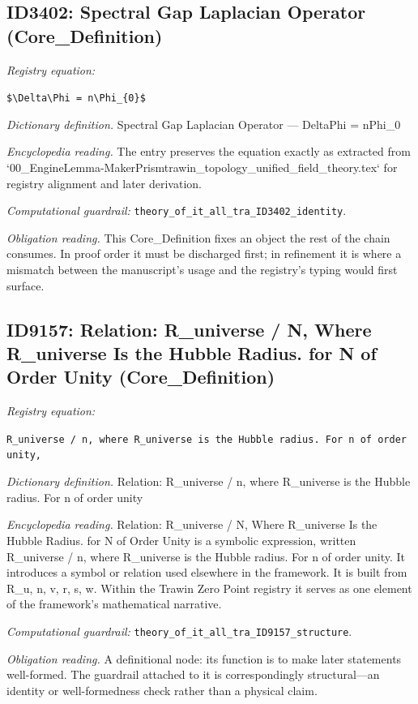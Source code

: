\documentclass[11pt]{article}
\theoremstyle{remark}
\begin{document}
\subsection{ID3402: Spectral Gap Laplacian Operator (Core\_Definition)}

\noindent\textit{Registry equation:}\par
{\small\texttt{\$\textbackslash{}Delta\textbackslash{}Phi = n\textbackslash{}Phi\_\{0\}\$}}\par\medskip
\noindent\textit{Dictionary definition.} Spectral Gap Laplacian Operator --- DeltaPhi = nPhi\_0\par\medskip
\noindent\textit{Encyclopedia reading.} The entry preserves the equation exactly as extracted from `00\_EngineLemma-MakerPrismtrawin\_topology\_unified\_field\_theory.tex` for registry alignment and later derivation.
\par\medskip\noindent\textit{Computational guardrail:} \texttt{theory\_of\_it\_all\_tra\_ID3402\_identity}.
\par\medskip\noindent\textit{Obligation reading.} This Core\_Definition fixes an object the rest of the chain consumes. In proof order it must be discharged first; in refinement it is where a mismatch between the manuscript's usage and the registry's typing would first surface.

\subsection{ID9157: Relation: R\_universe / N, Where R\_universe Is the Hubble Radius. for N of Order Unity (Core\_Definition)}

\noindent\textit{Registry equation:}\par
{\small\texttt{R\_universe / n, where R\_universe is the Hubble radius. For n of order unity,}}\par\medskip
\noindent\textit{Dictionary definition.} Relation: R\_universe / n, where R\_universe is the Hubble radius. For n of order unity\par\medskip
\noindent\textit{Encyclopedia reading.} Relation: R\_universe / N, Where R\_universe Is the Hubble Radius. for N of Order Unity is a symbolic expression, written R\_universe / n, where R\_universe is the Hubble radius. For n of order unity. It introduces a symbol or relation used elsewhere in the framework. It is built from R\_u, n, v, r, s, w. Within the Trawin Zero Point registry it serves as one element of the framework's mathematical narrative.
\par\medskip\noindent\textit{Computational guardrail:} \texttt{theory\_of\_it\_all\_tra\_ID9157\_structure}.
\par\medskip\noindent\textit{Obligation reading.} A definitional node: its function is to make later statements well-formed. The guardrail attached to it is correspondingly structural---an identity or well-formedness check rather than a physical claim.
\end{document}

